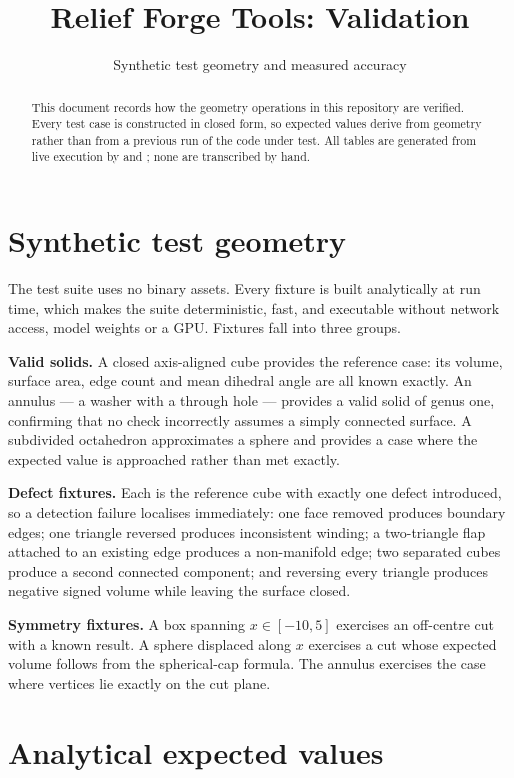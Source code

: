 \documentclass[11pt, a4paper]{article}
\title{Relief Forge Tools: Validation}
\author{Synthetic test geometry and measured accuracy}
\date{}
\begin{document}
\maketitle

\begin{abstract}
This document records how the geometry operations in this repository are
verified. Every test case is constructed in closed form, so expected values
derive from geometry rather than from a previous run of the code under test.
All tables are generated from live execution by  and
; none are transcribed by hand.
\end{abstract}

\section{Synthetic test geometry}

The test suite uses no binary assets. Every fixture is built analytically at
run time, which makes the suite deterministic, fast, and executable without
network access, model weights or a GPU. Fixtures fall into three groups.

\textbf{Valid solids.} A closed axis-aligned cube provides the reference case:
its volume, surface area, edge count and mean dihedral angle are all known
exactly. An annulus --- a washer with a through hole --- provides a valid solid
of genus one, confirming that no check incorrectly assumes a simply connected
surface. A subdivided octahedron approximates a sphere and provides a case
where the expected value is approached rather than met exactly.

\textbf{Defect fixtures.} Each is the reference cube with exactly one defect
introduced, so a detection failure localises immediately: one face removed
produces boundary edges; one triangle reversed produces inconsistent winding; a
two-triangle flap attached to an existing edge produces a non-manifold edge;
two separated cubes produce a second connected component; and reversing every
triangle produces negative signed volume while leaving the surface closed.

\textbf{Symmetry fixtures.} A box spanning $x \in [-10, 5]$ exercises an
off-centre cut with a known result. A sphere displaced along $x$ exercises a
cut whose expected volume follows from the spherical-cap formula. The annulus
exercises the case where vertices lie exactly on the cut plane.

\section{Analytical expected values}
\end{document}
